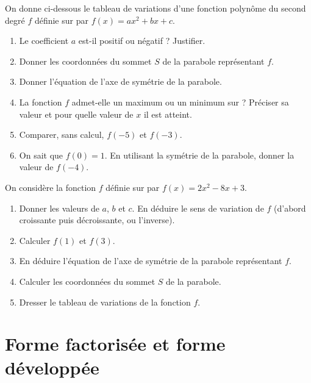 \documentclass[11pt,a4paper]{book}
\begin{document}
On donne ci-dessous le tableau de variations d'une fonction polynôme du second degré $f$ définie sur \R par $f(x)=ax^2+bx+c$.

\begin{center}
\end{center}

\begin{enumerate}[label=\textbf{\arabic*)}]
	\item Le coefficient $a$ est-il positif ou négatif ? Justifier.
	\item Donner les coordonnées du sommet $S$ de la parabole représentant $f$.
	\item Donner l'équation de l'axe de symétrie de la parabole.
	\item La fonction $f$ admet-elle un maximum ou un minimum sur \R ? Préciser sa valeur et pour quelle valeur de $x$ il est atteint.
	\item Comparer, sans calcul, $f(-5)$ et $f(-3)$.
	\item On sait que $f(0)=1$. En utilisant la symétrie de la parabole, donner la valeur de $f(-4)$.
\end{enumerate}

\exerciceDS{}

On considère la fonction $f$ définie sur \R par $f(x)=2x^2-8x+3$.

\begin{enumerate}[label=\textbf{\arabic*)}]
	\item Donner les valeurs de $a$, $b$ et $c$. En déduire le sens de variation de $f$ (d'abord croissante puis décroissante, ou l'inverse).
	\item Calculer $f(1)$ et $f(3)$.
	\item En déduire l'équation de l'axe de symétrie de la parabole représentant $f$.
	\item Calculer les coordonnées du sommet $S$ de la parabole.
	\item Dresser le tableau de variations de la fonction $f$.
\end{enumerate}

\section*{\color{green!55!black}Forme factorisée et forme développée}
\end{document}
